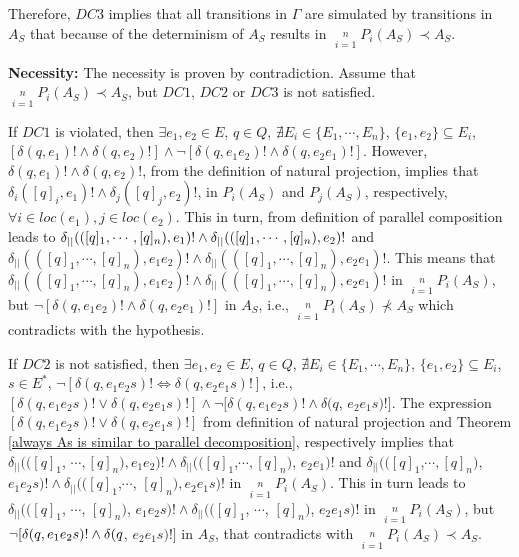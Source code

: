 Therefore, $DC3$ implies that all transitions in $\Gamma$ are simulated by transitions in $A_S$ that because of the determinism of $A_S$ results in
$\mathop {||}\limits_{i = 1}^n P_i \left( {A_S} \right)\prec
A_S$.


\textbf{Necessity:} The necessity is proven by contradiction. Assume
that $\mathop {||}\limits_{i = 1}^n P_i(A_S)\prec A_S$, but $DC1$,
$DC2$ or $DC3$ is not satisfied.

If $DC1$ is violated, then $\exists e_1, e_2 \in E$, $q\in Q$,
$\nexists E_i \in\{E_1,\cdots,E_n\}$, $\{e_1,e_2\}\subseteq E_i$,
$[\delta(q, e_1)!\wedge \delta(q, e_2)!]\wedge \neg [\delta(q,
e_1e_2)!\wedge \delta(q, e_2e_1)!]$. However, $\delta(q, e_1)!\wedge
\delta(q, e_2)!$, from the definition of natural projection, implies
that $\delta_i([q]_i, e_1)!\wedge \delta_j([q]_j, e_2)!$, in
$P_i(A_S)$ and $P_j(A_S)$, respectively, $\forall i\in loc(e_1),
j\in loc(e_2)$. This in turn, from definition of parallel
composition leads to $\delta_{||}(([q]_1,\cdots, [q]_n),\\ e_1)!
\wedge \delta_{||}(([q]_1,\cdots, [q]_n), e_2)!$ and
$\delta_{||}(([q]_1,\cdots, [q]_n), e_1e_2)! \wedge
\delta_{||}(([q]_1,\cdots, [q]_n), e_2e_1)!$. This means that
$\delta_{||}(([q]_1,\cdots, [q]_n), e_1e_2)! \wedge
\delta_{||}(([q]_1,\cdots, [q]_n), e_2e_1)!$ in $\mathop
{||}\limits_{i = 1}^n P_i(A_S)$, but $\neg [\delta(q, e_1e_2)!
\wedge \delta(q, e_2e_1)!]$ in $A_S$, i.e., $\mathop {||}\limits_{i
= 1}^n P_i(A_S)\nprec A_S$ which contradicts with the hypothesis.

If $DC2$ is not satisfied, then $\exists e_1, e_2 \in E$, $q\in Q$,
$\nexists E_i \in\{E_1,\cdots,E_n\}$, $\{e_1,e_2\}\subseteq E_i$,
$s\in E^*$, $ \neg [\delta(q, e_1e_2s)!\Leftrightarrow \delta(q,
e_2e_1s)!]$, i.e., $[\delta(q, e_1e_2s)!\vee \delta(q,
e_2e_1s)!]\wedge \neg [\delta(q, e_1e_2s)!\wedge \delta(q$,
$e_2e_1s)!]$. The expression $[\delta(q, e_1e_2s)!\vee \delta(q,
e_2e_1s)!]$ from definition of natural projection and Theorem
\ref{always As is similar to parallel decomposition}, respectively
implies that $\delta_{||}(([q]_1$, $\cdots, [q]_n), e_1e_2)! \wedge
\delta_{||}(([q]_1$,$\cdots, [q]_n)$, $e_2e_1)!$ and
$\delta_{||}(([q]_1$,$\cdots, [q]_n)$, $e_1e_2s)! \wedge
\delta_{||}(([q]_1$,$\cdots$, $[q]_n), e_2e_1s)!$ in $\mathop
{||}\limits_{i = 1}^n P_i(A_S)$. This in turn leads to\\
$\delta_{||}(([q]_1$, $\cdots$, $[q]_n)$, $e_1e_2s)! \wedge
\delta_{||}(([q]_1$, $\cdots$, $[q]_n)$, $e_2e_1s)!$ in $\mathop
{||}\limits_{i = 1}^n P_i(A_S)$, but $\neg [\delta(q, e_1e_2s)!
\wedge\\ \delta(q$, $e_2e_1s)!]$ in $A_S$, that contradicts with
$\mathop {||}\limits_{i = 1}^n P_i(A_S)\prec A_S$.

